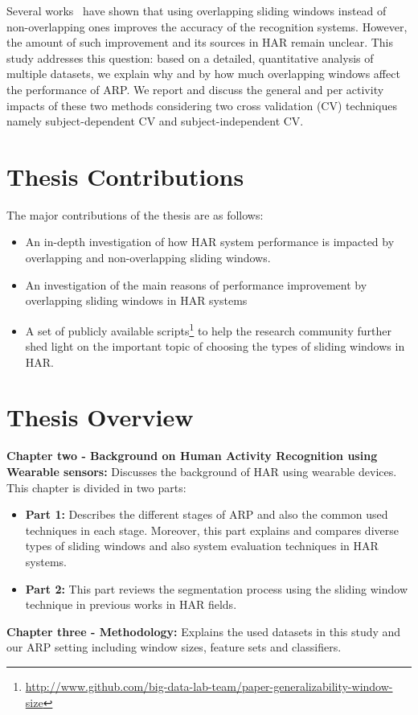 Several works~\citep{keogh2001online,janidarmian2014automated} have shown that using overlapping sliding windows instead of non-overlapping ones improves the accuracy of the recognition systems. However, the amount of such improvement and its sources in HAR remain unclear. This study addresses this question: based on a detailed, quantitative analysis of multiple datasets, we explain why and by how much overlapping windows affect the performance of ARP. We report and discuss the general and per activity impacts of these two methods considering two cross validation (CV) techniques namely subject-dependent CV and subject-independent CV. 

\section{Thesis Contributions}
The major contributions of the thesis are as follows:

\begin{itemize}

\item An in-depth investigation of how HAR system performance is impacted by overlapping and non-overlapping sliding windows.
\item An investigation of the main reasons of performance improvement by overlapping sliding windows in HAR systems 
\item A set of publicly available scripts\footnote{\url{http://www.github.com/big-data-lab-team/paper-generalizability-window-size}} to help the research community further shed light on the important topic of choosing the types of sliding windows in HAR.
\end{itemize}

\section{Thesis Overview}
\noindent\textbf{Chapter two - Background on Human Activity Recognition using Wearable sensors:}
Discusses the background of
HAR using wearable devices. This chapter is divided in two parts: 
\begin{itemize}
    \item \textbf{Part 1:}
    Describes the different stages of ARP and also the common used techniques in each stage. Moreover, this part explains and compares diverse types of sliding windows and also system evaluation techniques in HAR systems. \item \textbf{Part 2:}
    This part reviews the segmentation process using the sliding window technique in previous works in HAR fields. 
  
\end{itemize}{}
\noindent\textbf{Chapter three - Methodology:}
Explains the used datasets in this study and our ARP setting including window sizes, feature sets and classifiers.

